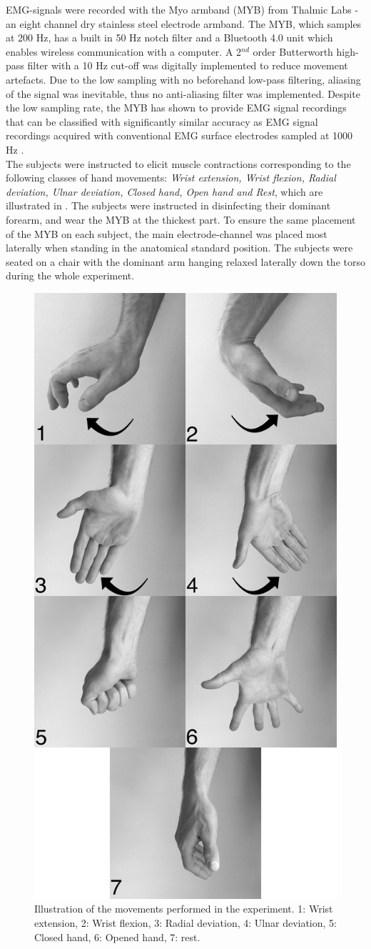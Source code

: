 EMG-signals were recorded with the Myo armband (MYB) from Thalmic Labs - an eight channel dry stainless steel electrode armband. The MYB, which samples at 200 Hz, has a built in 50 Hz notch filter and a Bluetooth 4.0 unit which enables wireless communication with a computer. A 2$^{nd}$ order Butterworth high-pass filter with a 10 Hz cut-off was digitally implemented to reduce movement artefacts. Due to the low sampling with no beforehand low-pass filtering, aliasing of the signal was inevitable, thus no anti-aliasing filter was implemented. Despite the low sampling rate, the MYB has shown to provide EMG signal recordings that can be classified with significantly similar accuracy as EMG signal recordings acquired with conventional EMG surface electrodes sampled at 1000 Hz \cite{Mendez2017}. \\
The subjects were instructed to elicit muscle contractions corresponding to the following classes of hand movements: \textit{Wrist extension, Wrist flexion, Radial deviation, Ulnar deviation, Closed hand, Open hand and Rest}, which are illustrated in . The subjects were instructed in disinfecting their dominant forearm, and wear the MYB at the thickest part. To ensure the same placement of the MYB on each subject, the main electrode-channel was placed most laterally when standing in the anatomical standard position. The subjects were seated on a chair with the dominant arm hanging relaxed laterally down the torso during the whole experiment. \\

\begin{figure}[H]                 
	\includegraphics[width=.4\textwidth]{figures/Paper/allHandMovementsVerticalBW}  
	\caption{Illustration of the movements performed in the experiment. 1: Wrist extension, 2: Wrist flexion, 3: Radial deviation, 4: Ulnar deviation, 5: Closed hand, 6: Opened hand, 7: rest.}
	\label{fig:P:experiment_movements} 
\end{figure}

